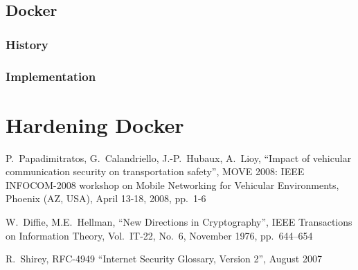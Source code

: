 \documentclass[a4paper,12pt]{article}
\def\rfc#1{RFC-#1\xspace}%
\begin{document}
\subsection{Docker}

\subsubsection{History}

\subsubsection{Implementation}

\newpage

\section{Hardening Docker}

\begin{thebibliography}{99}
%
%

P.~Papadimitratos, G.~Calandriello, J.-P.~Hubaux, A.~Lioy, ``Impact of vehicular
communication security on transportation safety'', MOVE 2008: IEEE INFOCOM-2008
workshop on Mobile Networking for Vehicular Environments, Phoenix (AZ, USA),
April 13-18, 2008, pp.~1-6 

W.~Diffie, M.E.~Hellman, ``New Directions in Cryptography'', IEEE Transactions
on Information Theory, Vol.~IT-22, No.~6, November 1976, pp.~644--654

R.~Shirey, \rfc{4949} ``Internet Security Glossary, Version 2'', August 2007

\end{thebibliography}
\end{document}
